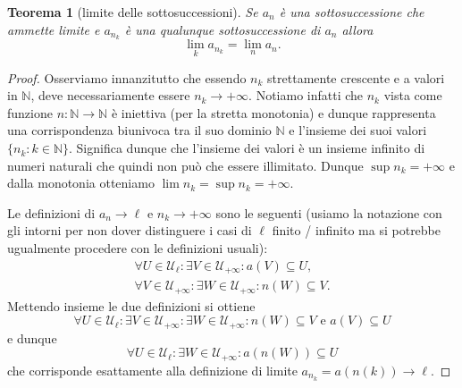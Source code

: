 \documentclass[italian,a4paper,oneside,headinclude]{scrbook}
\renewcommand{\subset}{\subseteq}
\newcommand{\U}{\mathcal U}
\newcommand{\NN}{\mathbb N}
\newtheorem{theorem}{Teorema}
\begin{document}
\begin{theorem}[limite delle sottosuccessioni]
Se $a_n$ è una sottosuccessione che ammette limite
e $a_{n_k}$ è una qualunque sottosuccessione di $a_n$
allora
\[
\lim_k a_{n_k} = \lim_n a_n.
\]
\end{theorem}
%
\begin{proof}
Osserviamo innanzitutto che essendo $n_k$ strettamente crescente
e a valori in $\NN$, deve necessariamente essere $n_k\to +\infty$.
Notiamo infatti che $n_k$ vista come funzione $n\colon \NN\to \NN$
è iniettiva (per la stretta monotonia) e dunque rappresenta una corrispondenza biunivoca tra il suo dominio $\NN$ e l'insieme dei suoi valori $\{n_k \colon k \in \NN\}$. Significa dunque che l'insieme dei valori è un insieme infinito di numeri naturali che quindi non può che
essere illimitato. Dunque $\sup n_k = +\infty$ e dalla monotonia
otteniamo $\lim n_k = \sup n_k = +\infty$.

Le definizioni di $a_n \to \ell$ e $n_k \to +\infty$ sono le seguenti
(usiamo la notazione con gli intorni per non dover distinguere
i casi di $\ell$ finito / infinito ma si potrebbe ugualmente
procedere con le definizioni usuali):
\begin{gather*}
 \forall U \in \U_\ell \colon \exists V \in \U_{+\infty} \colon
  a(V) \subset U,\\
 \forall V \in \U_{+\infty} \colon \exists W \in \U_{+\infty} \colon
  n(W) \subset V.
\end{gather*}
Mettendo insieme le due definizioni si ottiene
\[
  \forall U \in \U_\ell \colon
  \exists V \in \U_{+\infty} \colon
  \exists W \in \U_{+\infty} \colon
  n(W) \subset V \text{ e }
  a(V) \subset U
\]
e dunque
\[
  \forall U \in \U_\ell \colon \exists W \in \U_{+\infty} \colon
  a(n(W)) \subset U
\]
che corrisponde esattamente alla definizione di limite $a_{n_k} = a(n(k)) \to \ell$.
\end{proof}
\end{document}
